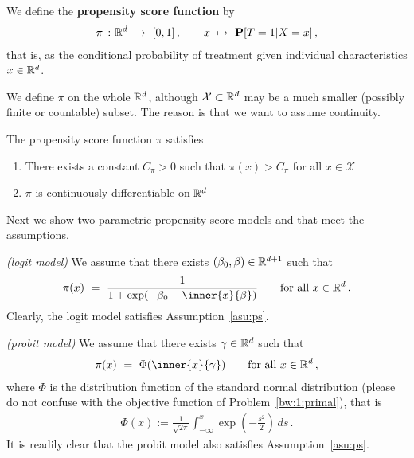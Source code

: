 \begin{definition}
  We define the \textbf{propensity score function} by
  \begin{gather*}
    \pi
    \ 
    \colon
    \R^d
    \ 
    \to
    \ 
    [0,1]
    \,,
    \qquad
    x
    \ 
    \mapsto
    \ 
    \P
    [
    T=1
    |
    X=x
    ]
    \,,
  \end{gather*}
  that is, 
  as the conditional probability of treatment given individual characteristics $x\in\mathbb{R}^d$.
\end{definition}
\begin{remark}
  We define $\pi$ on the whole $\mathbb{R}^d$, although $\mathcal{X}\subset \mathbb{R}^d$ may be a much smaller (possibly finite or countable) subset.
  The reason is that we want to assume continuity.
\end{remark}
\begin{assumption}
  \label{asu:ps}
  The propensity score function $\pi$ satisfies
  \begin{enumerate}[label=(\roman*)]
    \item
      There exists a constant $C_\pi>0$ such that 
      $\pi(x)>C_\pi$ for all $x\in\mathcal{X}$
    \item
      $\pi$ is continuously differentiable on $\mathbb{R}^d$
  \end{enumerate}
\end{assumption}

Next we show two parametric propensity score models and that meet the assumptions.
\begin{example}
  \emph{(logit model)}
  We assume that there exists $(\beta_0,\beta)\in\mathbb{R}^{d+1}$ such that
  \begin{gather*}
    \pi(x)
    \ 
    =
    \ 
    \frac{1}
    {1
      +
      \exp(-\beta_0-\inner{x}{\beta})
    }
    \qquad
    \text{for all}
    \ 
    x\in\R^d
    \,.
  \end{gather*}
  Clearly, the logit model satisfies Assumption~\ref{asu:ps}.
\end{example}

\begin{example}
  \emph{(probit model)}
  We assume that there exists $\gamma\in\mathbb{R}^d$ such that
  \begin{gather*}
    \pi(x)
    \ 
    =
    \ 
    \Phi(\inner{x}{\gamma})
    \qquad
    \text{for all}
    \ 
    x\in\R^d
    \,,
  \end{gather*}
  where $\Phi$ is the distribution function of the standard normal 
  distribution (please do not confuse with the objective function of Problem~\ref{bw:1:primal}), that is
  \begin{gather*}
    \Phi(x)
    :=
    \frac{1}{\sqrt{2\pi}}
    \int_{-\infty}
    ^x
    \exp
    \left( 
      -\frac{s^2}{2}
    \right)
    \,
    ds
    \,.
  \end{gather*}
  It is readily clear that the probit model also satisfies Assumption~\ref{asu:ps}.
\end{example}
